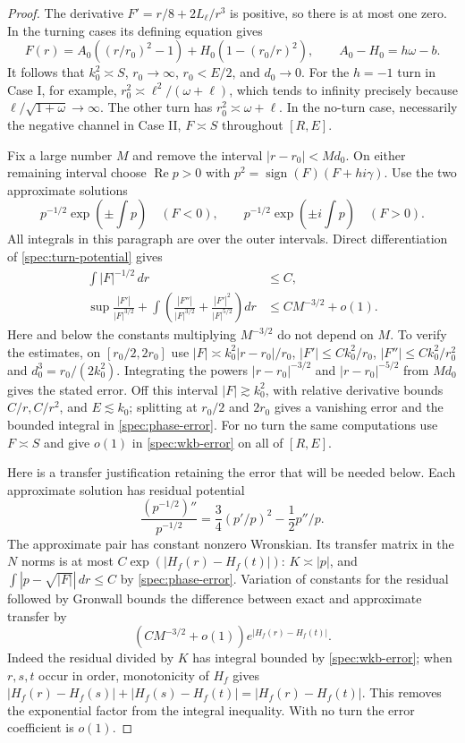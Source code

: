 \begin{proof}
The derivative $F'=r/8+2L_\ell/r^3$ is positive, so there is at most
one zero. In the turning cases its defining equation gives
\begin{equation}\label{spec:turn-potential}
 F(r)=A_0((r/r_0)^2-1)+H_0(1-(r_0/r)^2),\qquad
 A_0-H_0=h\omega-b.
\end{equation}
It follows that $k_0^2\asymp S$, $r_0\to\infty$, $r_0<E/2$, and
$d_0\to0$. For the $h=-1$ turn in Case I, for example,
$r_0^2\asymp \ell^2/(\omega+\ell)$, which tends to infinity precisely
because $\ell/\sqrt{1+\omega}\to\infty$. The other turn has
$r_0^2\asymp\omega+\ell$. In the no-turn case, necessarily the
negative channel in Case II, $F\asymp S$ throughout $[R,E]$.

Fix a large number $M$ and remove the interval $|r-r_0|<Md_0$.
On either remaining interval choose $\operatorname{Re}p>0$ with
$p^2=\operatorname{sign}(F)(F+hi\gamma)$. Use the two approximate
solutions
\[
 p^{-1/2}\exp(\pm\!\int p)\quad(F<0),\qquad
 p^{-1/2}\exp(\pm i\!\int p)\quad(F>0).
\]
All integrals in this paragraph are over the outer intervals. Direct
differentiation of \eqref{spec:turn-potential} gives
\begin{align}
 \int |F|^{-1/2}\,dr&\le C,\label{spec:phase-error}\\
 \sup\frac{|F'|}{|F|^{3/2}}+
 \int\left(\frac{|F''|}{|F|^{3/2}}
       +\frac{|F'|^2}{|F|^{5/2}}\right)dr
 &\le CM^{-3/2}+o(1).\label{spec:wkb-error}
\end{align}
Here and below the constants multiplying $M^{-3/2}$ do not depend on
$M$. To verify the estimates, on $[r_0/2,2r_0]$ use
$|F|\asymp k_0^2|r-r_0|/r_0$,
$|F'|\le Ck_0^2/r_0$, $|F''|\le Ck_0^2/r_0^2$ and
$d_0^3=r_0/(2k_0^2)$. Integrating the powers
$|r-r_0|^{-3/2}$ and $|r-r_0|^{-5/2}$ from $Md_0$ gives the stated
error. Off this interval $|F|\gtrsim k_0^2$, with relative derivative
bounds $C/r,C/r^2$, and $E\lesssim k_0$; splitting at $r_0/2$ and
$2r_0$ gives a vanishing error and the bounded integral in
\eqref{spec:phase-error}. For no turn the same computations use
$F\asymp S$ and give $o(1)$ in \eqref{spec:wkb-error} on all of $[R,E]$.

Here is a transfer justification retaining the error that will be
needed below. Each approximate solution has residual potential
\[
 \frac{(p^{-1/2})''}{p^{-1/2}}
 =\frac34(p'/p)^2-\frac12p''/p.
\]
The approximate pair has constant nonzero Wronskian. Its transfer
matrix in the $N$ norms is at most
$C\exp(|H_f(r)-H_f(t)|)$: $K\asymp|p|$, and
$\int|p-\sqrt{|F|}|\,dr\le C$ by \eqref{spec:phase-error}.
Variation of constants for the residual followed by Gronwall bounds
the difference between exact and approximate transfer by
\begin{equation}\label{spec:transfer-error}
 (CM^{-3/2}+o(1))e^{|H_f(r)-H_f(t)|}.
\end{equation}
Indeed the residual divided by $K$ has integral bounded by
\eqref{spec:wkb-error}; when $r,s,t$ occur in order, monotonicity of
$H_f$ gives
$|H_f(r)-H_f(s)|+|H_f(s)-H_f(t)|=|H_f(r)-H_f(t)|$.
This removes the exponential factor from the integral inequality.
With no turn the error coefficient is $o(1)$.


\end{proof}
